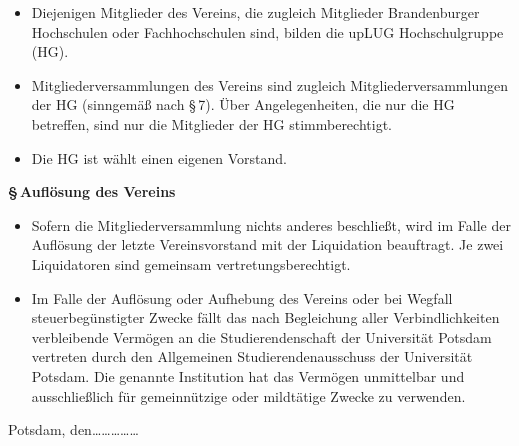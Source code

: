 \documentclass[11pt]{article}
\def\items#1{{%
  \itcounter0%
  \begin{itemize}
  #1
  \end{itemize}
}}
\let\it\item%
\def\item{
  \advance\itcounter1%
  \it[(\the\itcounter)]
}
\def\paragraf#1{
  \advance\itcounter1%
  \par\medskip
  {\large\bfseries \S\,\the\itcounter\quad#1}
  \par\smallskip
}
\begin{document}
\items{
  \item
    Diejenigen Mitglieder des Vereins, die zugleich Mitglieder Brandenburger Hochschulen oder
    Fachhochschulen sind, bilden die \glqq upLUG Hochschulgruppe\grqq{} (HG).
  \item
    Mitgliederversammlungen des Vereins sind zugleich Mitgliederversammlungen der HG (sinngem{\"a}{\ss} nach \S\,7).
    {\"U}ber Angelegenheiten, die nur die HG betreffen, sind nur die Mitglieder der HG
    stimmberechtigt. %
  \item
    Die HG ist w\"ahlt einen eigenen Vorstand.
}

\paragraf{Aufl{\"o}sung des Vereins}

\items{
   \item
     Sofern die Mitgliederversammlung nichts anderes beschlie{\ss}t, wird im Falle der Aufl{\"o}sung
     der letzte Vereinsvorstand mit der Liquidation beauftragt. Je zwei Liquidatoren sind
     gemeinsam vertretungsberechtigt.
   \item
     Im Falle der Aufl{\"o}sung oder Aufhebung des Vereins oder bei Wegfall steuerbeg{\"u}nstigter
     Zwecke f{\"a}llt das nach Begleichung aller Verbindlichkeiten verbleibende Verm{\"o}gen
     an die Studierendenschaft der Universit{\"a}t Potsdam vertreten durch
     den Allgemeinen Studierendenausschuss der Universit{\"a}t Potsdam.
     Die genannte Institution hat das Verm{\"o}gen unmittelbar und ausschlie{\ss}lich f{\"u}r
     gemeinn{\"u}tzige oder mildt{\"a}tige Zwecke zu verwenden.
}

\par\vskip12mm
Potsdam, den\qquad \ldots\ldots\ldots\ldots\ldots 
\end{document}
